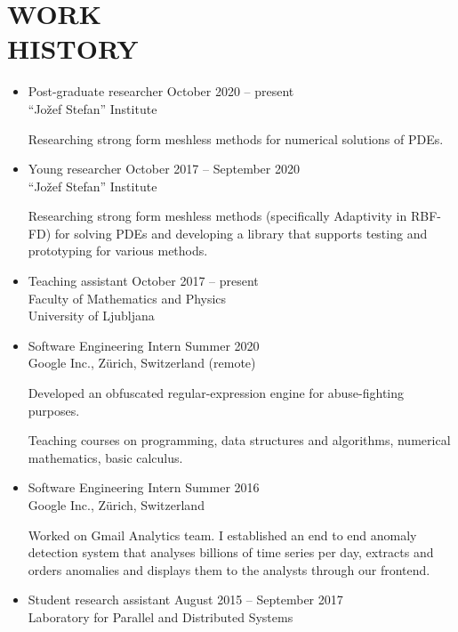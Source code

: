 \documentclass[line,margin]{res}
\newcommand{\wmeta}[1]{\sf#1\rm}
\newcommand{\wdesc}[1]{

#1

\vspace{6pt}}
\begin{document}
\section{WORK \\ HISTORY}
\begin{itemize}
  \item \wmeta{Post-graduate researcher \hfill October 2020 -- present \\
  \hspace*{\fill} ``Jožef Stefan'' Institute}
\wdesc{Researching strong form meshless methods for numerical solutions of
PDEs.}
  \item \wmeta{Young researcher \hfill October 2017 -- September 2020 \\
    \hspace*{\fill} ``Jožef Stefan'' Institute}
  \wdesc{Researching strong form meshless methods (specifically Adaptivity in
  RBF-FD) for solving PDEs
    and developing a library that supports testing and prototyping for various
    methods.}
  \item \wmeta{Teaching assistant \hfill October 2017 -- present \\
    \hspace*{\fill}  Faculty of Mathematics and Physics \\
    \hspace*{\fill} University of Ljubljana}
    \item \wmeta{Software Engineering Intern \hfill Summer 2020 \\
    \hspace*{\fill} Google Inc., Z\"urich, Switzerland (remote)}
  \wdesc{Developed an obfuscated regular-expression engine for abuse-fighting
    purposes.}
  \wdesc{Teaching courses on programming, data structures and algorithms,
    numerical mathematics, basic calculus.}
  \item \wmeta{Software Engineering Intern \hfill Summer 2016 \\
    \hspace*{\fill} Google Inc., Z\"urich, Switzerland}
  \wdesc{Worked on Gmail Analytics team. I established an end to end anomaly
    detection system that analyses billions of time series per day, extracts and
    orders anomalies and displays them to the analysts through our frontend.}
  \item \wmeta{Student research assistant \hfill August 2015 -- September 2017 \\
    \hspace*{\fill} Laboratory for Parallel and Distributed Systems \\
}
\end{itemize}
\end{document}
